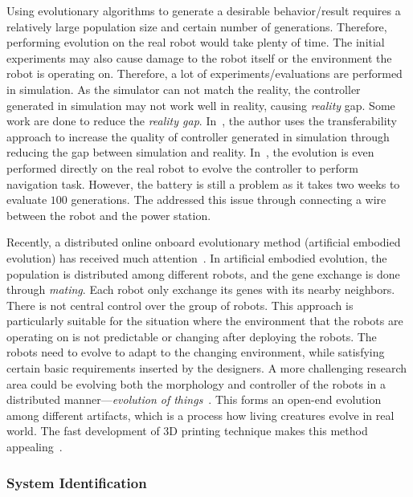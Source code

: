 Using evolutionary algorithms to generate a desirable behavior/result requires a relatively large population size and certain number of generations. Therefore, performing evolution on the real robot would take plenty of time. The initial experiments may also cause damage to the robot itself or the environment the robot is operating on. Therefore, a lot of experiments/evaluations are performed in simulation. As the simulator can not match the reality, the controller generated in simulation may not work well in reality, causing \textit{reality} gap. Some work are done to reduce the \textit{reality gap}. In~\cite{Koos:TEVC:2013, Koos:IJRR:2013}, the author uses the transferability approach to increase the quality of controller generated in simulation through reducing the gap between simulation and reality. In~\cite{Floreano1996}, the evolution is even performed directly on the real robot to evolve the controller to perform navigation task. However, the battery is still a problem as it takes two weeks to evaluate $100$ generations. The addressed this issue through connecting a wire between the robot and the power station. 

Recently, a distributed online onboard evolutionary method (artificial embodied evolution) has received much attention~\cite{Watson2012, eiben:inria-00531455, Eiben:EI:2012}. In artificial embodied evolution, the population is distributed among different robots, and the gene exchange is done through \textit{mating}. Each robot only exchange its genes with its nearby neighbors. There is not central control over the group of robots. This approach is particularly suitable for the situation where the environment that the robots are operating on is not predictable or changing after deploying the robots. The robots need to evolve to adapt to the changing environment, while satisfying certain basic requirements inserted by the designers. A more challenging research area could be evolving both the morphology and controller of the robots in a distributed manner---\textit{evolution of things}~\cite{Eiben:Nature:2015}. This forms an open-end evolution among different artifacts, which is a process how living creatures evolve in real world. The fast development of 3D printing technique makes this method appealing~\cite{Tumbleston20032015}. 

\subsubsection{System Identification}

